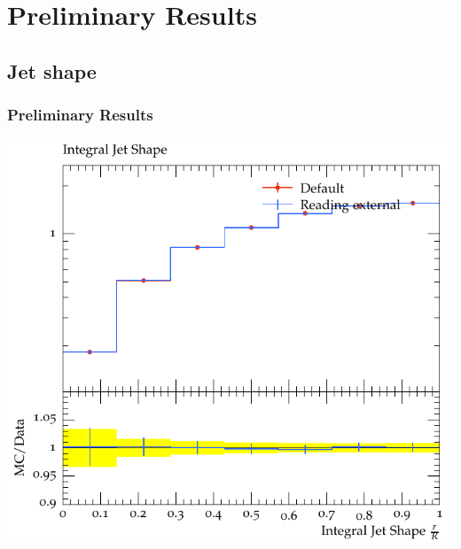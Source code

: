\documentclass{beamer}
\begin{document}
\section{Preliminary Results}
\subsection{Jet shape}

\begin{frame}\frametitle{Preliminary Results}

        
        \begin{minipage}{1.0\textwidth}
		\includegraphics[scale=0.6]{images/Int_shape_read.pdf}        
        \end{minipage}
\end{frame}
\end{document}

